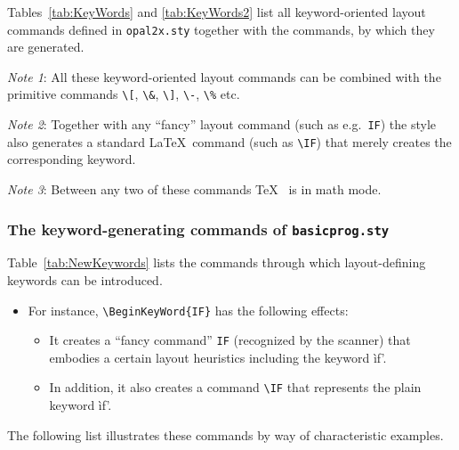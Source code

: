 Tables~\ref{tab:KeyWords} and \ref{tab:KeyWords2} list all keyword-oriented
layout commands defined in \texttt{opal2x.sty} together with the commands,
by which they are generated.

\emph{Note 1}: All these keyword-oriented layout commands can be combined
with the primitive commands \verb+\[+, \verb+\&+, \verb+\]+, \verb+\-+,
\verb+\%+ etc.

\emph{Note 2}: Together with any ``fancy'' layout command (such as
e.g.~\texttt{IF}) the style also generates a standard \LaTeX~command (such as
\verb+\IF+) that merely creates the corresponding keyword.%

\emph{Note 3}: Between any two of these commands \TeX~ is in math mode.



\subsubsection*{The keyword-generating commands of \texttt{basicprog.sty}}

Table~\ref{tab:NewKeywords} lists the commands through which
layout-defining keywords can be introduced.



\begin{itemize}
  \item For instance, \verb+\BeginKeyWord{IF}+ has the following effects:
  \begin{itemize}
    \item It creates a ``fancy command'' \verb+IF+ (recognized by the
      scanner) that embodies a certain layout heuristics including the
      keyword \`if'.
    \item In addition, it also creates a command \verb+\IF+ that represents
      the plain keyword \`if'.
  \end{itemize}
\end{itemize}

The following list illustrates these commands by way of characteristic
examples.

